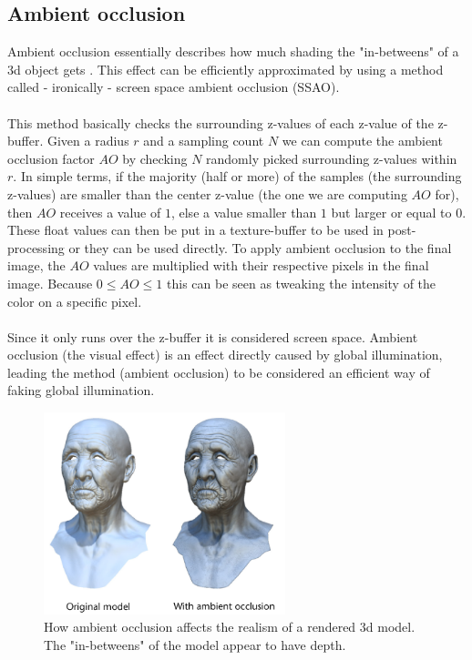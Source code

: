 \documentclass{ACGSeminar}
\begin{document}
	\subsection{Ambient occlusion}
		Ambient occlusion essentially describes how much shading the "in-betweens" of a 3d object gets \cite{AOM}. This effect can be efficiently approximated by using a method called - ironically - screen space ambient occlusion (SSAO). \\\\
		This method basically checks the surrounding z-values of each z-value of the z-buffer. Given a radius $r$ and a sampling count $N$ we can compute the ambient occlusion factor $AO$ by checking $N$ randomly picked surrounding z-values within $r$. In simple terms, if the majority (half or more) of the samples (the surrounding z-values) are smaller than the center z-value (the one we are computing $AO$ for), then $AO$ receives a value of $1$, else a value smaller than $1$ but larger or equal to $0$. These float values can then be put in a texture-buffer to be used in post-processing or they can be used directly. To apply ambient occlusion to the final image, the $AO$ values are multiplied with their respective pixels in the final image. Because $0 \leq AO \leq 1$ this can be seen as tweaking the intensity of the color on a specific pixel. \\\\
		Since it only runs over the z-buffer it is considered screen space. Ambient occlusion (the visual effect) is an effect directly caused by global illumination, leading the method (ambient occlusion) to be considered an efficient way of faking global illumination.
		\begin{figure}[htb!]%
			\begin{center}%
				\includegraphics[width=7cm]{img/ambient_occlusion.png}
			\end{center}%
			\caption{How ambient occlusion affects the realism of a rendered 3d model. The "in-betweens" of the model appear to have depth.}%
			\label{fig:normal_buffer}%
		\end{figure}%
\end{document}
